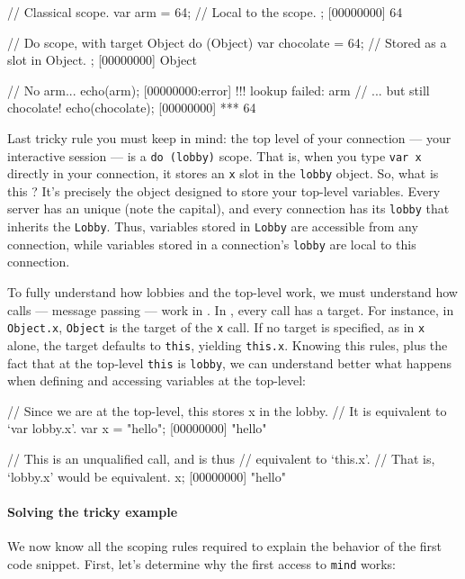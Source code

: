 \begin{urbiscript}
// Classical scope.
{
  var arm = 64; // Local to the scope.
};
[00000000] 64

// Do scope, with target Object
do (Object)
{
  var chocolate = 64; // Stored as a slot in Object.
};
[00000000] Object

// No arm...
echo(arm);
[00000000:error] !!! lookup failed: arm
// ... but still chocolate!
echo(chocolate);
[00000000] *** 64
\end{urbiscript}

Last tricky rule you must keep in mind: the top level of your
connection --- your interactive session --- is a %
\lstinline|do (lobby)| scope. That is, when you type \lstinline|var x|
directly in your connection, it stores an \lstinline|x| slot in the
\lstinline|lobby| object. So, what is this ? It's precisely
the object designed to store your top-level variables. Every \urbi
server has an unique  (note the capital), and every
connection has its \lstinline|lobby| that inherits the
\lstinline|Lobby|. Thus, variables stored in \lstinline|Lobby| are
accessible from any connection, while variables stored in a
connection's \lstinline|lobby| are local to this connection.

To fully understand how lobbies and the top-level work, we must
understand how calls --- message passing --- work in \us.  In \us,
every call has a target. For instance, in \lstinline|Object.x|,
\lstinline|Object| is the target of the \lstinline|x| call. If no
target is specified, as in \lstinline|x| alone, the target defaults to
\lstinline|this|, yielding \lstinline|this.x|. Knowing this rules,
plus the fact that at the top-level \lstinline|this| is
\lstinline|lobby|, we can understand better what happens when defining
and accessing variables at the top-level:

\begin{urbiscript}
// Since we are at the top-level, this stores x in the lobby.
// It is equivalent to `var lobby.x'.
var x = "hello";
[00000000] "hello"

// This is an unqualified call, and is thus
// equivalent to `this.x'.
// That is, `lobby.x' would be equivalent.
x;
[00000000] "hello"
\end{urbiscript}

\paragraph{Solving the tricky example}
We now know all the scoping rules required to explain the behavior of
the first code snippet. First, let's determine why the first access to
\lstinline|mind| works:


